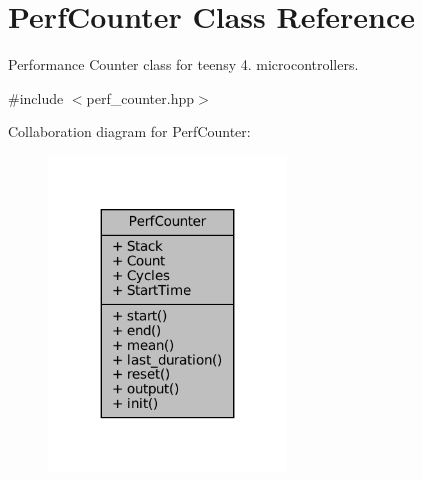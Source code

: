 \hypertarget{classPerfCounter}{}\section{Perf\+Counter Class Reference}
\label{classPerfCounter}


Performance Counter class for teensy 4. microcontrollers.  




{\ttfamily \#include $<$perf\+\_\+counter.\+hpp$>$}



Collaboration diagram for Perf\+Counter\+:\nopagebreak
\begin{figure}[H]
\begin{center}
\leavevmode
\includegraphics[width=179pt]{d3/dba/classPerfCounter__coll__graph}
\end{center}
\end{figure}
